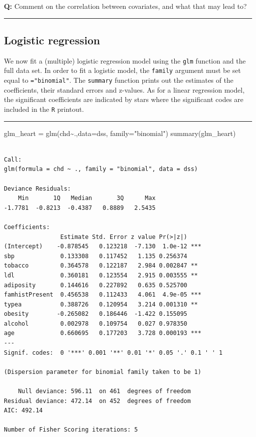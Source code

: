 \documentclass[
  letterpaper,
  DIV=11,
  numbers=noendperiod]{scrartcl}
\newenvironment{Shaded}{\begin{snugshade}}{\end{snugshade}}
\newcommand{\AttributeTok}[1]{\textcolor[rgb]{0.40,0.45,0.13}{#1}}
\newcommand{\FunctionTok}[1]{\textcolor[rgb]{0.28,0.35,0.67}{#1}}
\newcommand{\NormalTok}[1]{\textcolor[rgb]{0.00,0.23,0.31}{#1}}
\newcommand{\OtherTok}[1]{\textcolor[rgb]{0.00,0.23,0.31}{#1}}
\newcommand{\SpecialCharTok}[1]{\textcolor[rgb]{0.37,0.37,0.37}{#1}}
\newcommand{\StringTok}[1]{\textcolor[rgb]{0.13,0.47,0.30}{#1}}
\begin{document}
\textbf{Q:} Comment on the correlation between covariates, and what that
may lead to?

\begin{center}\rule{0.5\linewidth}{0.5pt}\end{center}

\hypertarget{logistic-regression-1}{%
\subsection{Logistic regression}\label{logistic-regression-1}}

We now fit a (multiple) logistic regression model using the \texttt{glm}
function and the full data set. In order to fit a logistic model, the
\texttt{family} argument must be set equal to \texttt{="binomial"}. The
\texttt{summary} function prints out the estimates of the coefficients,
their standard errors and z-values. As for a linear regression model,
the significant coefficients are indicated by stars where the
significant codes are included in the \texttt{R} printout.

\begin{center}\rule{0.5\linewidth}{0.5pt}\end{center}

\begin{Shaded}
\begin{Highlighting}[]
\NormalTok{glm\_heart }\OtherTok{=} \FunctionTok{glm}\NormalTok{(chd}\SpecialCharTok{\textasciitilde{}}\NormalTok{.,}\AttributeTok{data=}\NormalTok{dss, }\AttributeTok{family=}\StringTok{"binomial"}\NormalTok{)}
\FunctionTok{summary}\NormalTok{(glm\_heart)}
\end{Highlighting}
\end{Shaded}

\begin{verbatim}

Call:
glm(formula = chd ~ ., family = "binomial", data = dss)

Deviance Residuals: 
    Min       1Q   Median       3Q      Max  
-1.7781  -0.8213  -0.4387   0.8889   2.5435  

Coefficients:
                Estimate Std. Error z value Pr(>|z|)    
(Intercept)    -0.878545   0.123218  -7.130  1.0e-12 ***
sbp             0.133308   0.117452   1.135 0.256374    
tobacco         0.364578   0.122187   2.984 0.002847 ** 
ldl             0.360181   0.123554   2.915 0.003555 ** 
adiposity       0.144616   0.227892   0.635 0.525700    
famhistPresent  0.456538   0.112433   4.061  4.9e-05 ***
typea           0.388726   0.120954   3.214 0.001310 ** 
obesity        -0.265082   0.186446  -1.422 0.155095    
alcohol         0.002978   0.109754   0.027 0.978350    
age             0.660695   0.177203   3.728 0.000193 ***
---
Signif. codes:  0 '***' 0.001 '**' 0.01 '*' 0.05 '.' 0.1 ' ' 1

(Dispersion parameter for binomial family taken to be 1)

    Null deviance: 596.11  on 461  degrees of freedom
Residual deviance: 472.14  on 452  degrees of freedom
AIC: 492.14

Number of Fisher Scoring iterations: 5
\end{verbatim}
\end{document}
